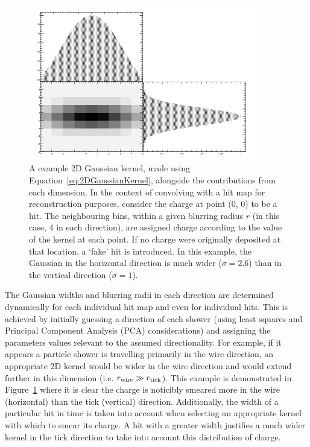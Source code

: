 \begin{figure}
  \centering
  \includegraphics[width=10cm]{2DGaussianKernel.png}
  \caption[A example 2D Gaussian kernel alongside the contributions from each dimension.]{A example 2D Gaussian kernel, made using Equation~\ref{eq:2DGaussianKernel}, alongside the contributions from each dimension.  In the context of convolving with a hit map for reconstruction purposes, consider the charge at point (0, 0) to be a hit.  The neighbouring bins, within a given blurring radius $r$ (in this case, 4 in each direction), are assigned charge according to the value of the kernel at each point.  If no charge were originally deposited at that location, a `fake' hit is introduced.  In this example, the Gaussian in the horizontal direction is much wider ($\sigma=2.6$) than in the vertical direction ($\sigma=1$).}
  \label{fig:2DGaussianKernel}
\end{figure}

The Gaussian widths and blurring radii in each direction are determined dynamically for each individual hit map and even for individual hits.  This is achieved by initially guessing a direction of each shower (using least squares and Principal Component Analysis (PCA) considerations) and assigning the parameters values relevant to the assumed directionality.  For example, if it appears a particle shower is travelling primarily in the wire direction, an appropriate 2D kernel would be wider in the wire direction and would extend further in this dimension (i.e. $r_{\textnormal{wire}} \gg r_{\textnormal{tick}}$).  This example is demonstrated in Figure~\ref{fig:2DGaussianKernel} where it is clear the charge is noticibly smeared more in the wire (horizontal) than the tick (vertical) direction.  Additionally, the width of a particular hit in time is taken into account when selecting an appropriate kernel with which to smear its charge.  A hit with a greater width justifies a much wider kernel in the tick direction to take into account this distribution of charge.


